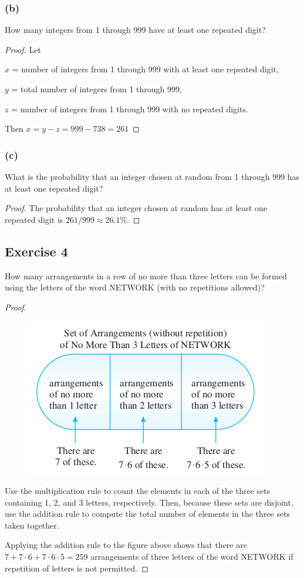 \documentclass[14pt]{extarticle}
\begin{document}
\subsubsection{(b)}
How many integers from 1 through 999 have at least one repeated digit?

\begin{proof}
Let 

$x$ = number of integers from 1 through 999 with at least one repeated digit,

$y$ = total number of integers from 1 through 999,

$z$ = number of integers from 1 through 999 with no repeated digits.

Then \(x = y - z = 999 - 738 = 261\)
\end{proof}

\subsubsection{(c)}
What is the probability that an integer chosen at random from 1 through 999 has at least one repeated digit?

\begin{proof}
The probability that an integer chosen at random has at least one repeated digit is \(261/999 \approx 26.1\%\).
\end{proof}

\subsection{Exercise 4}
How many arrangements in a row of no more than three letters can be formed using the letters of the word NETWORK 
(with no repetitions allowed)?

\begin{proof}
\begin{figure}[ht!]
\centering
\includegraphics[scale=0.5]{../images/9.3.4.png}
\end{figure}

Use the multiplication rule to count the elements in each of the three sets containing 1, 2, and 3 letters, respectively. 
Then, because these sets are disjoint, use the addition rule to compute the total number of elements in the three sets 
taken together.

Applying the addition rule to the figure above shows that there are \(7 + 7 \cdot 6 + 7 \cdot 6 \cdot 5 = 259\) 
arrangements of three letters of the word NETWORK if repetition of letters is not permitted.
\end{proof}
\end{document}
